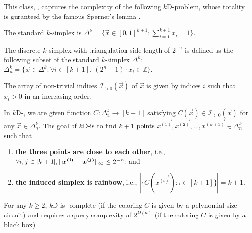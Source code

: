 This class, \PPAD, captures the complexity of the following $k$D-\Sperner problem, whose totality is guranteed by the famous Sperner's lemma \cite{sperner1928neuer}.

\begin{definition}
    \label{def:standard-simplex}
    The standard $k$-simplex is $\Delta^k = \{\vec{x}\in [0,1]^{k+1}: \sum_{i=1}^{k+1} x_i=1\}$.
\end{definition}


\begin{definition}
    \label{def:discrete-simplex}
    The discrete $k$-simplex with triangulation side-length of $2^{-n}$ is defined as the following subset of the standard $k$-simplex $\Delta^k$: $\Delta^k_n = \{\vec{x}\in \Delta^k: \forall i\in [k+1], ~ (2^n-1)\cdot x_i\in \mathbb{Z} \}$.
\end{definition}


\begin{definition}
    The array of non-trivial indices $\mathcal{I}_{>0}(\vec{x})$ of $\vec{x}$ is given by indices $i$ such that $x_i>0$ in an increasing order.
\end{definition}


\begin{definition}[$k${\rm D}-\Sperner]
    In $k${\rm D}-\Sperner, we are given function 
    $C:\Delta^k_n \to [k+1]$ satisfying $C(\vec{x}) \in \mathcal{I}_{>0}(\vec{x})$ for any $\vec{x}\in \Delta^k_n$.
    The goal of $k${\rm D}-\Sperner is to find $k+1$ points $\vec{x^{(1)}},\vec{x^{(2)}}, \dots, \vec{x^{(k+1)}}\in \Delta_n^k$ such that
    \begin{enumerate}[itemsep=0.2em,topsep=0.5em]
        \item {\bf the three points are close to each other}, i.e., $\forall i,j\in [k+1], \| {\boldsymbol{x^{(i)}}-\boldsymbol{x^{(j)}}} \|_{\infty}\leq 2^{-n}$; and 
        \item {\bf the induced simplex is rainbow}, i.e., $|\{C(\vec{x^{(i)}}): i\in [k+1]\}|=k+1$.
    \end{enumerate}
\end{definition}

\begin{theorem}
    For any $k\geq 2$, $k${\rm D}-\Sperner is \PPAD-complete (if the coloring $C$ is given by a polynomial-size circuit) and requires a query complexity of $2^{\Omega(n)}$ (if the coloring $C$ is given by a black box).
\end{theorem}